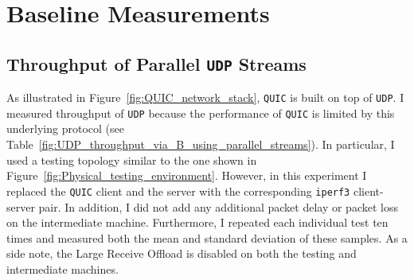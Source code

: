 \documentclass[12pt,a4paper]{report}
\begin{document}
\section{Baseline Measurements}


\subsection{Throughput of Parallel \texttt{UDP} Streams} \label{section_Throughput_of_Parallel_UDP_Streams}

As illustrated in Figure~\ref{fig:QUIC_network_stack}, \texttt{QUIC} is built on top of \texttt{UDP}.
I measured throughput of \texttt{UDP} because the performance of \texttt{QUIC} is limited by this underlying protocol (see Table~\ref{fig:UDP_throughput_via_B_using_parallel_streams}).
In particular, I used a testing topology similar to the one shown in  Figure~\ref{fig:Physical_testing_environment}.
However, in this experiment I replaced the \texttt{QUIC} client and the server with the corresponding \texttt{iperf3} client-server pair.
In addition, I did not add any additional packet delay or packet loss on the intermediate machine.
Furthermore, I repeated each individual test ten times and measured both the mean and standard deviation of these samples.
As a side note, the Large Receive Offload is disabled on both the testing and intermediate machines.
\end{document}
